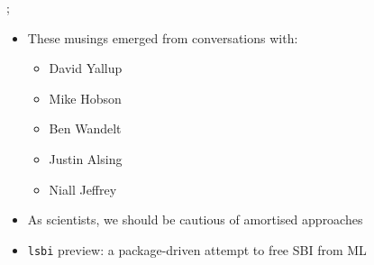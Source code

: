 \documentclass[aspectratio=169]{beamer}
\begin{document}
\begin{frame}
{    };
    \begin{itemize}
        \item These musings emerged from conversations with:
            \begin{itemize}
                \item David Yallup
                \item Mike Hobson
                \item Ben Wandelt
                \item Justin Alsing
                \item Niall Jeffrey
            \end{itemize}
        \item As scientists, we should be cautious of amortised approaches
        \item \texttt{lsbi} preview: a package-driven attempt to free SBI from ML
    \end{itemize}
\end{frame}
\end{document}
